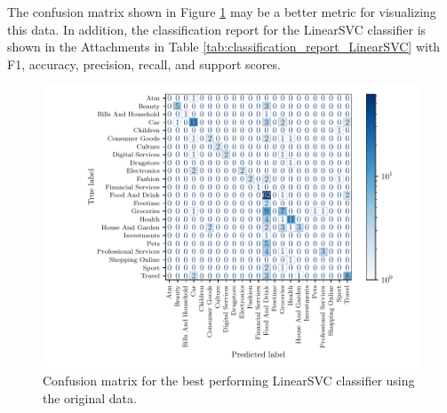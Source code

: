 The confusion matrix shown in Figure \ref{fig:confusion_matrix} may be a better metric for visualizing this data. In addition, the classification report for the LinearSVC classifier is shown in the Attachments in Table \ref{tab:classification_report_LinearSVC} with F1, accuracy, precision, recall, and support scores.

\begin{figure}[ht]
  \centering
  \includegraphics[width=\textwidth]{../img/plot_cm_LinearSVC_original}
  \caption{Confusion matrix for the best performing LinearSVC classifier using the original data.}
  \label{fig:confusion_matrix}
\end{figure}


